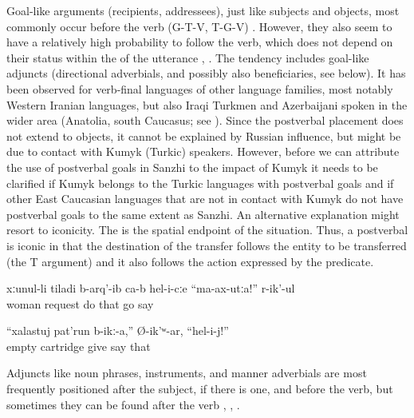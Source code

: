 Goal-like arguments (recipients, addressees), just like subjects and objects, most commonly occur before the verb (G-T-V, T-G-V) . However, they also seem to have a relatively high probability to follow the verb, which does not depend on their status within the  of the utterance , . The tendency includes goal-like adjuncts (directional adverbials, and possibly also beneficiaries, see below). It has been observed for verb-final languages of other language families, most notably Western Iranian languages, but also Iraqi Turkmen and Azerbaijani spoken in the wider area (Anatolia, south Caucasus; see \citealp{Haig2014}). Since the postverbal placement does not extend to objects, it cannot be explained by Russian influence, but might be due to contact with Kumyk (Turkic) speakers. However, before we can attribute the use of postverbal goals in Sanzhi to the impact of Kumyk it needs to be clarified if Kumyk belongs to the Turkic languages with postverbal goals and if other East Caucasian languages that are not in contact with Kumyk do not have postverbal goals to the same extent as Sanzhi. An alternative explanation might resort to iconicity. The  is the spatial endpoint of the situation. Thus, a postverbal  is iconic in that the destination of the transfer follows the entity to be transferred (the T argument) and it also follows the action expressed by the predicate.
%
\begin{exe}
	\ex	\label{ex:‎His wife begged him, Do not go constituents}
	\gll	xːunul-li	tiladi	b-arq'-ib	ca-b	hel-i-cːe	``ma-ax-utːa!''	r-ik'-ul\\
		woman	request	do		that	go	say\\
	\glt	{}

	\ex	\label{ex:He said, Give him an empty cartridge!}
	\gll	``xalastuj	pat'run	b-ikː-a,''	Ø-ik'ʷ-ar,	``hel-i-j!''\\
		empty	cartridge	give	say	that\\
	\glt	{}
\end{exe}

Adjuncts like  noun phrases, instruments, and manner adverbials are most frequently positioned after the subject, if there is one, and before the verb, but sometimes they can be found after the verb , , . 

